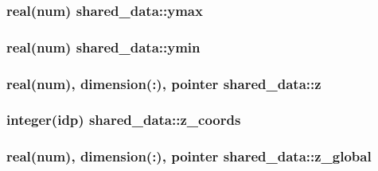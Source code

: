 \subsubsection[{\texorpdfstring{ymax}{ymax}}]{\setlength{\rightskip}{0pt plus 5cm}real(num) shared\+\_\+data\+::ymax}\hypertarget{namespaceshared__data_abe75e74d4222157dbf64bb183266cd5d}{}\label{namespaceshared__data_abe75e74d4222157dbf64bb183266cd5d}
\subsubsection[{\texorpdfstring{ymin}{ymin}}]{\setlength{\rightskip}{0pt plus 5cm}real(num) shared\+\_\+data\+::ymin}\hypertarget{namespaceshared__data_a1a0991602b1e5feb2d937663c8e31927}{}\label{namespaceshared__data_a1a0991602b1e5feb2d937663c8e31927}
\subsubsection[{\texorpdfstring{z}{z}}]{\setlength{\rightskip}{0pt plus 5cm}real(num), dimension(\+:), pointer shared\+\_\+data\+::z}\hypertarget{namespaceshared__data_a2094b23a08f2ff99add0a52c71d13b04}{}\label{namespaceshared__data_a2094b23a08f2ff99add0a52c71d13b04}
\subsubsection[{\texorpdfstring{z\+\_\+coords}{z_coords}}]{\setlength{\rightskip}{0pt plus 5cm}integer(idp) shared\+\_\+data\+::z\+\_\+coords}\hypertarget{namespaceshared__data_a208c54ff19ecd9211442644004e44a79}{}\label{namespaceshared__data_a208c54ff19ecd9211442644004e44a79}
\subsubsection[{\texorpdfstring{z\+\_\+global}{z_global}}]{\setlength{\rightskip}{0pt plus 5cm}real(num), dimension(\+:), pointer shared\+\_\+data\+::z\+\_\+global}\hypertarget{namespaceshared__data_a560ccdd90913c790de3698e6caa6ed8b}{}\label{namespaceshared__data_a560ccdd90913c790de3698e6caa6ed8b}

